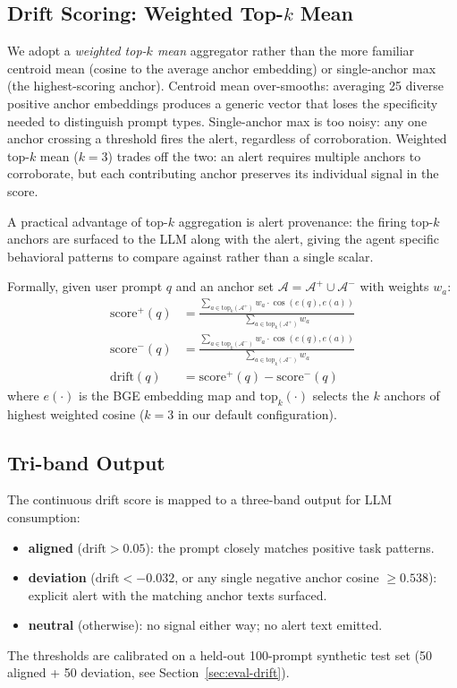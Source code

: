 \subsection{Drift Scoring: Weighted Top-$k$ Mean}
\label{sec:method-scoring}

We adopt a \emph{weighted top-$k$ mean} aggregator rather than
the more familiar centroid mean (cosine to the average anchor
embedding) or single-anchor max (the highest-scoring anchor).
Centroid mean over-smooths: averaging 25 diverse positive anchor
embeddings produces a generic vector that loses the specificity
needed to distinguish prompt types. Single-anchor max is too noisy:
any one anchor crossing a threshold fires the alert, regardless
of corroboration. Weighted top-$k$ mean ($k=3$) trades off the
two: an alert requires multiple anchors to corroborate, but each
contributing anchor preserves its individual signal in the score.

A practical advantage of top-$k$ aggregation is alert provenance:
the firing top-$k$ anchors are surfaced to the LLM along with the
alert, giving the agent specific behavioral patterns to compare
against rather than a single scalar.

Formally, given user prompt $q$ and an anchor set
$\mathcal{A} = \mathcal{A}^+ \cup \mathcal{A}^-$ with weights $w_a$:
\begin{align}
\mathrm{score}^+(q) &= \frac{\sum_{a \in \mathrm{top}_k(\mathcal{A}^+)} w_a \cdot \cos(e(q), e(a))}{\sum_{a \in \mathrm{top}_k(\mathcal{A}^+)} w_a} \\
\mathrm{score}^-(q) &= \frac{\sum_{a \in \mathrm{top}_k(\mathcal{A}^-)} w_a \cdot \cos(e(q), e(a))}{\sum_{a \in \mathrm{top}_k(\mathcal{A}^-)} w_a} \\
\mathrm{drift}(q) &= \mathrm{score}^+(q) - \mathrm{score}^-(q)
\end{align}
where $e(\cdot)$ is the BGE embedding map and
$\mathrm{top}_k(\cdot)$ selects the $k$ anchors of highest
weighted cosine ($k=3$ in our default configuration).

\subsection{Tri-band Output}
\label{sec:method-band}

The continuous drift score is mapped to a three-band output for
LLM consumption:
\begin{itemize}
\item \textbf{aligned} ($\mathrm{drift} > 0.05$): the prompt
  closely matches positive task patterns.
\item \textbf{deviation} ($\mathrm{drift} < -0.032$, or any
  single negative anchor cosine $\geq 0.538$): explicit alert
  with the matching anchor texts surfaced.
\item \textbf{neutral} (otherwise): no signal either way; no
  alert text emitted.
\end{itemize}
The thresholds are calibrated on a held-out 100-prompt synthetic
test set (50 aligned + 50 deviation, see
Section~\ref{sec:eval-drift}).

